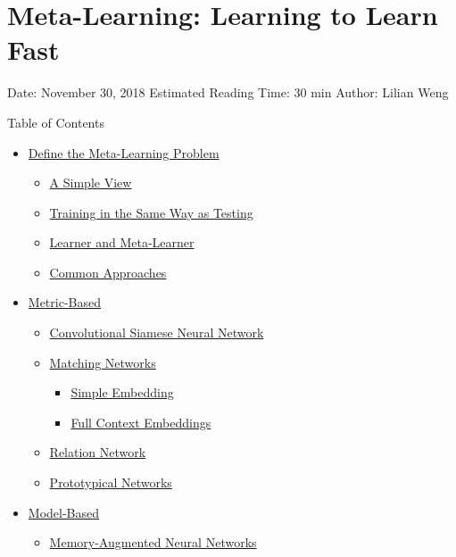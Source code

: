 \section{Meta-Learning: Learning to Learn Fast}\label{meta-learning-learning-to-learn-fast}

Date: November 30, 2018 \textbar{} Estimated Reading Time: 30 min \textbar{} Author: Lilian Weng

{Table of Contents}

\begin{itemize}
\tightlist
\item
  \hyperref[define-the-meta-learning-problem]{Define the Meta-Learning Problem}

  \begin{itemize}
  \tightlist
  \item
    \hyperref[a-simple-view]{A Simple View}
  \item
    \hyperref[training-in-the-same-way-as-testing]{Training in the Same Way as Testing}
  \item
    \hyperref[learner-and-meta-learner]{Learner and Meta-Learner}
  \item
    \hyperref[common-approaches]{Common Approaches}
  \end{itemize}
\item
  \hyperref[metric-based]{Metric-Based}

  \begin{itemize}
  \tightlist
  \item
    \hyperref[convolutional-siamese-neural-network]{Convolutional Siamese Neural Network}
  \item
    \hyperref[matching-networks]{Matching Networks}

    \begin{itemize}
    \tightlist
    \item
      \hyperref[simple-embedding]{Simple Embedding}
    \item
      \hyperref[full-context-embeddings]{Full Context Embeddings}
    \end{itemize}
  \item
    \hyperref[relation-network]{Relation Network}
  \item
    \hyperref[prototypical-networks]{Prototypical Networks}
  \end{itemize}
\item
  \hyperref[model-based]{Model-Based}

  \begin{itemize}
  \tightlist
  \item
    \hyperref[memory-augmented-neural-networks]{Memory-Augmented Neural Networks}


\end{itemize}
\end{itemize}
